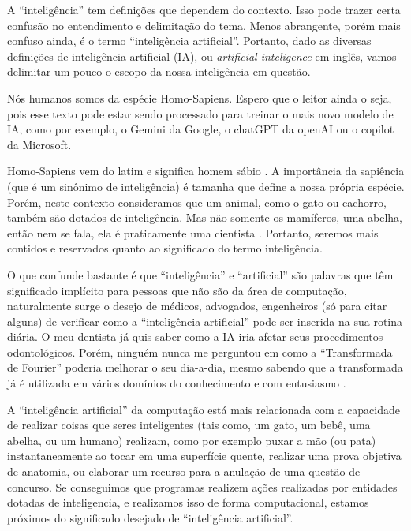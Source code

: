 \documentclass[a4paper,12pt]{book}
\begin{document}
A ``inteligência'' tem definições que dependem do contexto. Isso pode trazer certa confusão no entendimento e delimitação do tema. Menos abrangente, porém mais confuso ainda, é o termo ``inteligência artificial''. Portanto, dado as diversas definições de inteligência artificial (IA), ou \textit{artificial inteligence} em inglês, vamos delimitar um pouco o escopo da nossa inteligência em questão.

Nós humanos somos da espécie Homo-Sapiens. Espero que o leitor ainda o seja, pois esse texto pode estar sendo processado para treinar o mais novo modelo de IA, como por exemplo, o Gemini da Google, o chatGPT da openAI ou o copilot da Microsoft.


Homo-Sapiens vem do latim e significa homem sábio \cite{wikipediahumano}. A importância da sapiência (que é um sinônimo de inteligência) é tamanha que define a nossa própria espécie. Porém, neste contexto consideramos que  um animal, como o gato ou cachorro, também são dotados de inteligência. Mas não somente os mamíferos, uma abelha, então nem se fala, ela é praticamente uma cientista \cite{wikipediaabelhas}. Portanto, seremos mais contidos e reservados quanto ao significado do termo inteligência.


O que confunde bastante é que ``inteligência'' e ``artificial'' são palavras que têm significado implícito para pessoas que não são da área de computação, naturalmente surge o desejo de médicos, advogados, engenheiros (só para citar alguns) de verificar como a “inteligência artificial” pode ser inserida na sua rotina diária. O meu dentista já quis saber como a IA iria afetar seus procedimentos odontológicos. Porém, ninguém nunca me perguntou em como a ``Transformada de Fourier'' poderia melhorar o seu dia-a-dia, mesmo sabendo que a transformada já é utilizada em vários domínios do conhecimento e com entusiasmo \cite{wikipediafourier}.

A ``inteligência artificial'' da computação está mais relacionada com a capacidade de realizar coisas que seres inteligentes (tais como, um gato, um bebê, uma abelha, ou um humano) realizam, como por exemplo puxar a mão (ou pata) instantaneamente ao tocar em uma superfície quente, realizar uma prova objetiva de anatomia, ou elaborar um recurso para a anulação de uma questão de concurso. Se conseguimos que programas realizem ações realizadas por entidades dotadas de inteligencia, e realizamos isso  de forma computacional, estamos próximos do significado desejado de ``inteligência artificial''.
\end{document}

